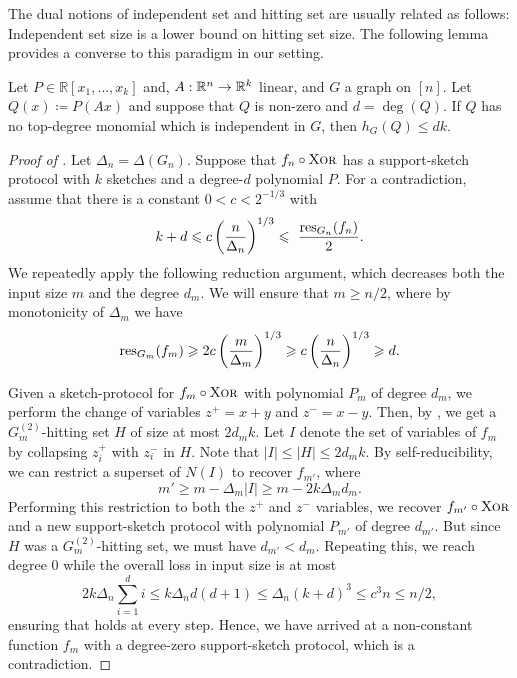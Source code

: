 \documentclass{article}
\begin{document}
The dual notions of independent set and hitting set are usually related as follows: Independent set size is a lower bound on hitting set size. The following lemma provides a converse to this paradigm in our setting.

\begin{boxlemma}\label{lem:h-bound}
    Let $P \in \mathbb{R}[x_1,\dots,x_k]$ and, $A:\mathbb{R}^n\to \mathbb{R}^k$ linear, and $G$ a graph on $[n]$.
    Let $Q(x) \coloneqq P(Ax)$ and suppose that $Q$ is non-zero and $d = \deg(Q)$. If $Q$ has no top-degree monomial which is independent in $G$, then $h_G(Q) \leq dk$.
\end{boxlemma}

\begin{proof}[Proof of ]
    Let $\Delta_n = \Delta(G_n)$. Suppose that $f_n\circ \operatorname{\textsc{Xor}}$ has a support-sketch protocol with $k$ sketches and a degree-$d$ polynomial $P$. For a contradiction, assume that there is a constant $0 < c < 2^{-1/3}$ with
    \[
           k+d \leqslant c\left(\frac{n}{\Delta_n}\right)^{1/3} \leqslant\  \frac{\operatorname{res}_{G_n}(f_n)}{2}.
    \]
    We repeatedly apply the following reduction argument, which decreases both the input size $m$ and the degree $d_m$. We will ensure that $m \geq n/2$, where by monotonicity of $\Delta_m$ we have
    \begin{equation}\label{eq:assumption}
        \operatorname{res}_{G_m}(f_m)
        \geqslant
        2c\left(\frac{m}{\Delta_m}\right)^{1/3}
        \geqslant c\left(\frac{n}{\Delta_n}\right)^{1/3}\geqslant d.
    \end{equation}
    
    Given a sketch-protocol for $f_m\circ \operatorname{\textsc{Xor}}$ with polynomial $P_m$ of degree $d_m$, we perform the change of variables $z^+ = x+y$ and $z^-=x-y$. Then, by , we get a $G_m^{(2)}$-hitting set $H$ of size at most $2d_m k$. Let $I$ denote the set of variables of $f_m$ by collapsing $z^+_i$ with $z^-_i$ in $H$. Note that $|I| \leq |H| \leq 2d_m k$. By self-reducibility, we can restrict a superset of $N(I)$ to recover $f_{m'}$, where 
    \[
        m'\geq m-\Delta_m|I| \geq m - 2k\Delta_m d_m.
    \]
    Performing this restriction to both the $z^+$ and $z^-$ variables, we recover $f_{m'}\circ\operatorname{\textsc{Xor}}$ and a new support-sketch protocol with polynomial $P_{m'}$ of degree $d_{m'}$. But since $H$ was a $G^{(2)}_m$-hitting set, we must have $d_{m'} < d_m$.
    Repeating this, we reach degree $0$ while the overall loss in input size is at most 
    \[
        2k\Delta_n\sum_{i=1}^d i\leq k\Delta_n d(d+1) \leq \Delta_n(k+d)^3 \leq c^3n \leq n/2,
    \]
    ensuring that  holds at every step.
    Hence, we have arrived at a non-constant function $f_m$ with a degree-zero support-sketch protocol, which is a contradiction.
\end{proof}
\end{document}
